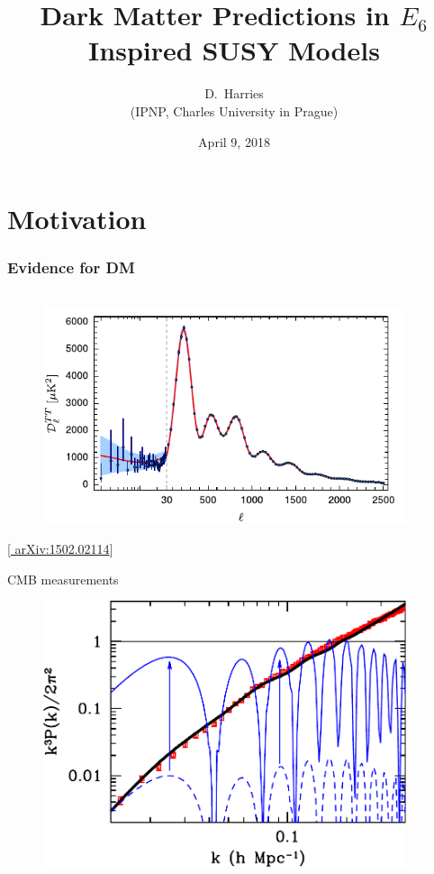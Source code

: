 \documentclass[10pt,aspectratio=169]{beamer}
\title{Dark Matter Predictions in $E_6$ Inspired SUSY Models}
\author{D.~Harries\\
  {\scriptsize
  (IPNP, Charles University in Prague)}
  }
\date[\'{U}TF, Charles University in Prague]{April 9, 2018}
\begin{document}
\begin{frame}[plain]
  \titlepage
\end{frame}

\section{Motivation}

\begin{frame}
  \frametitle{Evidence for DM}
  \begin{columns}[t]
    \begin{column}{0.3\textwidth}
      \vspace*{-20pt}
      \begin{figure}
        \centering
        \includegraphics[width=0.95\textwidth]{cmb_power_spectrum}
      \end{figure}
      \vspace*{-25pt}
      \begin{center}
        { \tiny [\href{http://arxiv.org/abs/1502.02114}{%
              arXiv:1502.02114}] }
      \end{center}
      \vspace*{-20pt}
      \begin{center}
        CMB measurements
      \end{center}
      \vspace*{-15pt}
      \begin{figure}
        \centering
        \includegraphics[width=0.95\textwidth]{matter_power_spectrum}

\end{figure}
\end{column}
\end{columns}
\end{frame}
\end{document}
